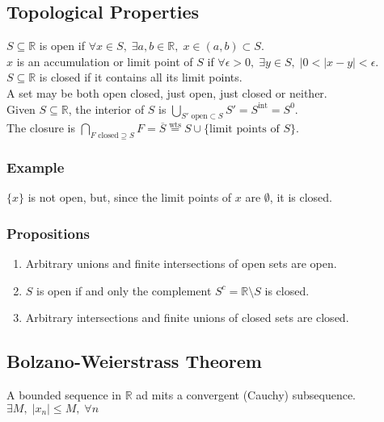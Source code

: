\documentclass[11pt]{article}
\newcommand{\0}{\emptyset}
\newcommand{\R}{\mathbb{R}}
\begin{document}
\subsection*{Topological Properties}
\label{sec:org308a43d}
\(S\subseteq\R\) is open if \(\forall x\in S,\;\exists a,b\in\R,\;x\in(a,b)\subset S\).\\[0pt]
\(x\) is an accumulation or limit point of \(S\) if \(\forall\epsilon>0,\;\exists y\in S,\;|0<|x-y|<\epsilon\).\\[0pt]
\(S\subseteq\R\) is closed if it contains all its limit points.\\[0pt]
A set may be both open closed, just open, just closed or neither.\\[0pt]
Given \(S\subseteq\R\), the interior of \(S\) is \(\bigcup_{S'\text{ open}\subset S}S'=S^{\text{int}}=S^{0}\).\\[0pt]
The closure is \(\bigcap_{F\text{ closed}\supseteq S}F=\overline{S}\overset{\text{wts}}{=}S\cup\{\text{limit points of }S\}\).\\[0pt]
\subsubsection*{Example}
\label{sec:org4668b20}
\(\{x\}\) is not open, but, since the limit points of \(x\) are \(\0\), it is closed.\\[0pt]
\subsubsection*{Propositions}
\label{sec:org05753cb}
\begin{enumerate}
\item Arbitrary unions and finite intersections of open sets are open.\\[0pt]
\item \(S\) is open if and only the complement \(S^{c}=\R\setminus S\) is closed.\\[0pt]
\item Arbitrary intersections and finite unions of closed sets are closed.\\[0pt]
\end{enumerate}
\subsection*{Bolzano-Weierstrass Theorem}
\label{sec:orgbb27dff}
A bounded sequence in \(\R\) ad mits a convergent (Cauchy) subsequence. \(\exists M,\;|x_{n}|\leq M,\;\forall n\)\\[0pt]
\end{document}
